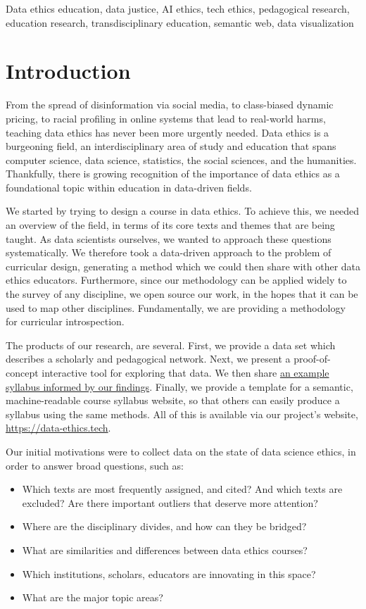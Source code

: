 \documentclass[
]{article}
\providecommand{\tightlist}{%
  \setlength{\itemsep}{0pt}\setlength{\parskip}{0pt}}
\begin{document}
Data ethics education, data justice, AI ethics, tech ethics, pedagogical
research, education research, transdisciplinary education, semantic web,
data visualization

\hypertarget{introduction}{%
\section{Introduction}\label{introduction}}

From the spread of disinformation via social media, to class-biased
dynamic pricing, to racial profiling in online systems that lead to
real-world harms, teaching data ethics has never been more urgently
needed. Data ethics is a burgeoning field, an interdisciplinary area of
study and education that spans computer science, data science,
statistics, the social sciences, and the humanities. Thankfully, there
is growing recognition of the importance of data ethics as a
foundational topic within education in data-driven fields.

We started by trying to design a course in data ethics. To achieve this,
we needed an overview of the field, in terms of its core texts and
themes that are being taught. As data scientists ourselves, we wanted to
approach these questions systematically. We therefore took a data-driven
approach to the problem of curricular design, generating a method which
we could then share with other data ethics educators. Furthermore, since
our methodology can be applied widely to the survey of any discipline,
we open source our work, in the hopes that it can be used to map other
disciplines. Fundamentally, we are providing a methodology for
curricular introspection.

The products of our research, are several. First, we provide a data set
which describes a scholarly and pedagogical network. Next, we present a
proof-of-concept interactive tool for exploring that data. We then share
\href{http://data-ethics.jonreeve.com/}{an example syllabus informed by
our findings}. Finally, we provide a template for a semantic,
machine-readable course syllabus website, so that others can easily
produce a syllabus using the same methods. All of this is available via
our project's website, \url{https://data-ethics.tech}.

Our initial motivations were to collect data on the state of data
science ethics, in order to answer broad questions, such as:

\begin{itemize}
\tightlist
\item
  Which texts are most frequently assigned, and cited? And which texts
  are excluded? Are there important outliers that deserve more
  attention?
\item
  Where are the disciplinary divides, and how can they be bridged?
\item
  What are similarities and differences between data ethics courses?
\item
  Which institutions, scholars, educators are innovating in this space?
\item
  What are the major topic areas?
\end{itemize}
\end{document}
